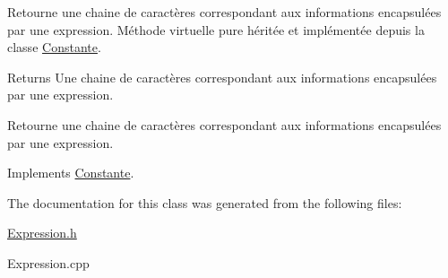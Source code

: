 \-Retourne une chaine de caractères correspondant aux informations encapsulées par une expression. \-Méthode virtuelle pure héritée et implémentée depuis la classe \hyperlink{classConstante}{\-Constante}. 

\begin{DoxyReturn}{\-Returns}
\-Une chaine de caractères correspondant aux informations encapsulées par une expression.
\end{DoxyReturn}
\-Retourne une chaine de caractères correspondant aux informations encapsulées par une expression. 

\-Implements \hyperlink{classConstante_ad5ea6850196ee9f86b74c74009a87ab1}{\-Constante}.



\-The documentation for this class was generated from the following files\-:\begin{DoxyCompactItemize}
\item 
\hyperlink{Expression_8h}{\-Expression.\-h}\item 
\-Expression.\-cpp\end{DoxyCompactItemize}

